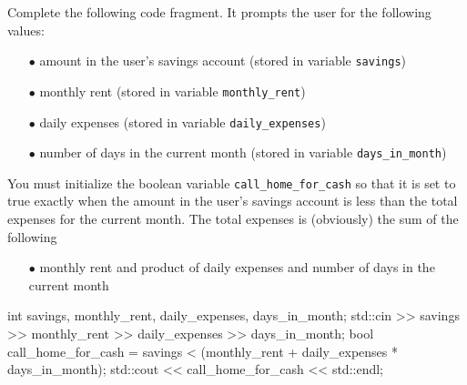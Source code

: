 \nextq
Complete the following code fragment.
It prompts the user for the following values:
\begin{enumerate}
\item[$\bullet$] amount in the user's savings account (stored in variable \verb!savings!)
\item[$\bullet$] monthly rent (stored in variable \verb!monthly_rent!)
\item[$\bullet$] daily expenses (stored in variable \verb!daily_expenses!)
\item[$\bullet$] number of days in the current month (stored in variable \verb!days_in_month!)
\end{enumerate}
You must initialize the boolean variable \verb!call_home_for_cash! so that it is set to true exactly when the amount in the user's savings account is less than the total expenses for the current month. The total expenses is (obviously) the sum of the following
\begin{enumerate}
\item[$\bullet$]monthly rent and product of daily expenses and number of days in the current month
\end{enumerate}
\ANSWER
\begin{answercode}
int savings, monthly_rent, daily_expenses, days_in_month;
std::cin >> savings >> monthly_rent >> daily_expenses >> days_in_month;
bool call_home_for_cash = savings < (monthly_rent + daily_expenses * days_in_month);
std::cout << call_home_for_cash << std::endl;
\end{answercode}


